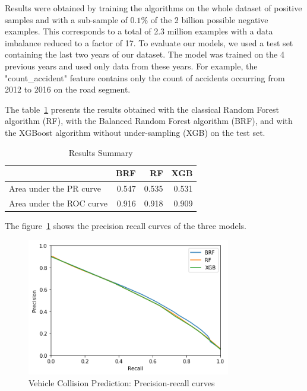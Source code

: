 \documentclass[conference]{IEEEtran}
\begin{document}
Results were obtained by training the algorithms on the whole
dataset of positive samples and with a sub-sample of $0.1\%$ of the 2
billion possible negative examples. This corresponds to a total of 2.3
million examples with a data imbalance reduced to a factor of 17. To
evaluate our models, we used a test set containing the last two years of our
dataset. The model was trained on the 4 previous years and used only data
from these years. For example, the "count\_accident" feature contains only
the count of accidents occurring from 2012 to 2016 on the road segment.

The table~\ref{table:summary} presents the results obtained with the classical
Random Forest algorithm (RF), with the Balanced Random Forest algorithm (BRF), and with the XGBoost algorithm without under-sampling (XGB) on the test set.

\begin{table}[htbp]
\caption{Results Summary}
\begin{center}
\begin{tabular}{|l|r|r|r|}
\hline
                 &    BRF &    RF &    XGB \\
\hline
Area under the PR curve &  0.547 &  0.535 &  0.531 \\
Area under the ROC curve &  0.916 &  0.918 &  0.909 \\
\hline
\end{tabular}
\label{table:summary}
\end{center}
\end{table}

The figure~\ref{fig:precision-recall} shows the precision recall curves of the three models.

\begin{figure}[htbp]
\centerline{\includegraphics[height=6cm, keepaspectratio]{figures/pr.png}}
\caption{Vehicle Collision Prediction: Precision-recall curves}
\label{fig:precision-recall}
\end{figure}
\end{document}
